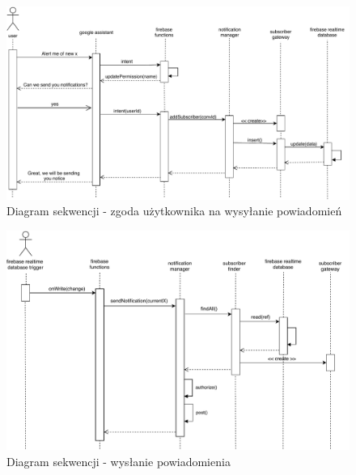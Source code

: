 \documentclass[a4paper,11pt]{article}
\begin{document}
     \begin{figure}[!h]
    	\begin{center}
    		\includegraphics[width=16cm]{guess-x-permission.pdf}
    	\end{center}
    	\caption[Caption for LOF]{Diagram sekwencji - zgoda użytkownika na wysyłanie powiadomień}
    	\label{permission}
    \end{figure}

     \begin{figure}[!h]
		\begin{center}
			\includegraphics[width=16cm]{guess-x-send-notifications.pdf}
		\end{center}
		\caption[Caption for LOF]{Diagram sekwencji - wysłanie powiadomienia}
		\label{send-notifications}
	\end{figure}
\end{document}
